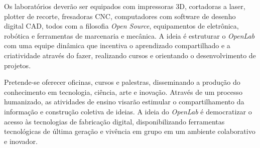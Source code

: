 Os laboratórios deverão ser equipados com impressoras 3D, cortadoras a laser, plotter de recorte, fresadoras CNC, computadores com software de desenho digital CAD, todos com a filosofia \textit{Open Source}, equipamentos de eletrônica, robótica e ferramentas de marcenaria e mecânica. A ideia é estruturar o \textit{OpenLab} com uma equipe dinâmica que incentiva o aprendizado compartilhado e a criatividade através do fazer, realizando cursos e orientando o desenvolvimento de projetos.

Pretende-se oferecer oficinas, cursos e palestras, disseminando a produção do conhecimento em tecnologia, ciência, arte e inovação. Através de um processo humanizado, as atividades de ensino visarão estimular o compartilhamento da informação e construção coletiva de ideias. A ideia do \textit{OpenLab} é democratizar o acesso às tecnologias de fabricação digital, disponibilizando ferramentas tecnológicas de última geração e vivência em grupo em um ambiente colaborativo e inovador.
